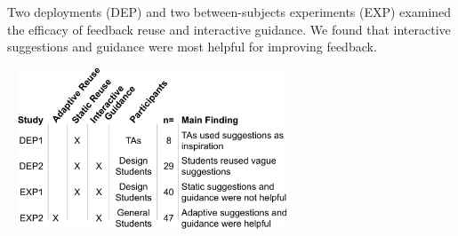 \begin{table}[t]
\centering
  \caption{Two deployments (DEP) and two between-subjects experiments (EXP) examined the efficacy of feedback reuse and interactive guidance. We found that interactive suggestions and guidance were most helpful for improving feedback.}~\label{table:critiquekit_all_results}
  \includegraphics[width=0.6\textwidth]{critiquekit/figures/table1.png}
\end{table}
